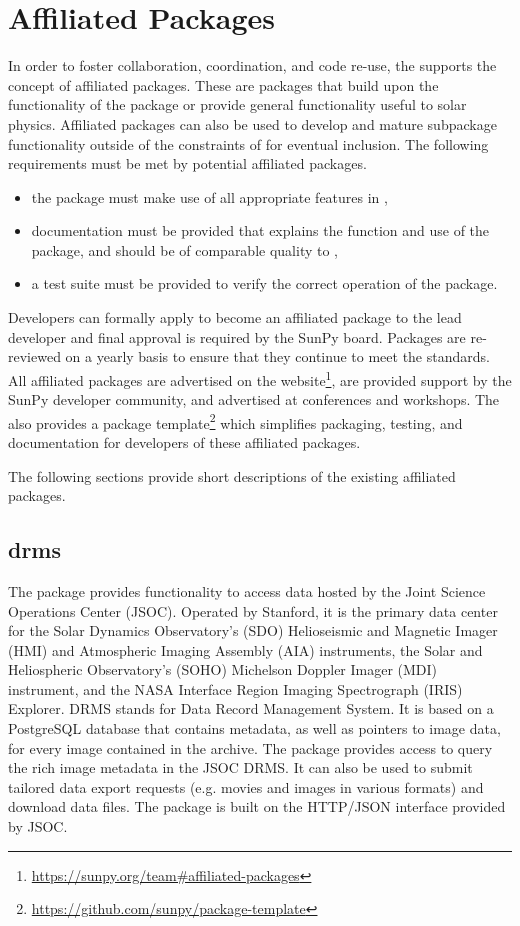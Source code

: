 \section{Affiliated Packages}
\label{sec:affil_package}

In order to foster collaboration, coordination, and code re-use, the \sunpyproj supports the concept of affiliated packages.
These are \python packages that build upon the functionality of the \sunpypkg package or provide general functionality useful to solar physics.
Affiliated packages can also be used to develop and mature subpackage functionality outside of the constraints of \sunpypkg for eventual inclusion.
The following requirements must be met by potential affiliated packages.
\begin{itemize}
    \item the package must make use of all appropriate features in \sunpypkg,
    \item documentation must be provided that explains the function and use of the package, and should be of comparable quality to \sunpypkg,
    \item a test suite must be provided to verify the correct operation of the package.
\end{itemize}
Developers can formally apply to become an affiliated package to the lead developer and final approval is required by the SunPy board.
Packages are re-reviewed on a yearly basis to ensure that they continue to meet the standards.
All affiliated packages are advertised on the website\footnote{\url{https://sunpy.org/team\#affiliated-packages}}, are provided support by the SunPy developer community, and advertised at conferences and workshops.
The \sunpyproj also provides a package template\footnote{\url{https://github.com/sunpy/package-template}} which simplifies packaging, testing, and documentation for developers of these affiliated packages.

The following sections provide short descriptions of the existing affiliated packages.

\subsection{drms}
\label{sec:drms}

The  package provides functionality to access data hosted by the Joint Science Operations Center (JSOC).
Operated by Stanford, it is the primary data center for the Solar Dynamics Observatory’s (SDO) Helioseismic and Magnetic Imager (HMI) and Atmospheric Imaging Assembly (AIA) instruments, the Solar and Heliospheric Observatory's (SOHO) Michelson Doppler Imager (MDI) instrument, and the NASA Interface Region Imaging Spectrograph (IRIS) Explorer.
DRMS stands for Data Record Management System. It is based on a PostgreSQL database that contains metadata, as well as pointers to image data, for every image contained in the archive.
The  package provides access to query the rich image metadata in the JSOC DRMS. It can also be used to submit tailored data export requests (e.g. movies and images in various formats) and download data files.
The package is built on the HTTP/JSON interface provided by JSOC.

